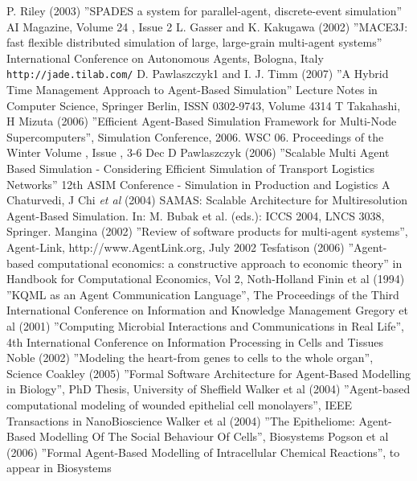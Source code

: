 
\begin{thebibliography}{99}
 P. Riley (2003) ''SPADES a system for parallel-agent, discrete-event simulation'' AI Magazine, Volume 24 ,  Issue 2
 L. Gasser and K. Kakugawa (2002) ''MACE3J: fast flexible distributed simulation of large, large-grain multi-agent systems'' International Conference on Autonomous Agents, Bologna, Italy 
 \texttt{http://jade.tilab.com/}
 D. Pawlaszczyk1 and I. J. Timm (2007) ''A Hybrid Time Management Approach to Agent-Based Simulation''	Lecture Notes in Computer Science, Springer Berlin, ISSN	0302-9743, Volume 4314
 T Takahashi, H Mizuta (2006) ''Efficient Agent-Based Simulation Framework for Multi-Node Supercomputers'', Simulation Conference, 2006. WSC 06. Proceedings of the Winter Volume , Issue , 3-6 Dec
 D Pawlaszczyk (2006) ''Scalable Multi Agent Based Simulation - Considering Efficient Simulation of Transport Logistics Networks'' 12th ASIM Conference - Simulation in Production and Logistics
  A Chaturvedi, J Chi \textsl{et al} (2004) SAMAS: Scalable Architecture for Multiresolution Agent-Based Simulation. In: M. Bubak et al. (eds.): ICCS 2004,
LNCS 3038, Springer.
 Mangina (2002) ''Review of software products for multi-agent systems'', Agent-Link, http://www.AgentLink.org, July 2002
 Tesfatison (2006) ''Agent-based computational economics: a constructive approach to economic theory'' in Handbook for Computational Economics, Vol 2, Noth-Holland
 Finin et al (1994) ''KQML as an Agent Communication Language'', The Proceedings of  the Third International Conference on Information and Knowledge Management
 Gregory et al (2001)  ''Computing Microbial Interactions and Communications in Real Life'', 4th International Conference on Information Processing in Cells and Tissues
 Noble (2002)  ''Modeling the heart-from genes to cells to the whole organ'', Science
 Coakley  (2005) ''Formal Software Architecture for Agent-Based Modelling in Biology'', PhD Thesis, University of Sheffield
 Walker et al (2004) ''Agent-based computational modeling of wounded epithelial cell monolayers'', IEEE Transactions in NanoBioscience
 Walker et al (2004) ''The Epitheliome: Agent-Based Modelling Of The Social Behaviour Of Cells'', Biosystems
 Pogson  et al (2006) ''Formal Agent-Based Modelling of Intracellular Chemical Reactions'', to appear in Biosystems

\end{thebibliography}
